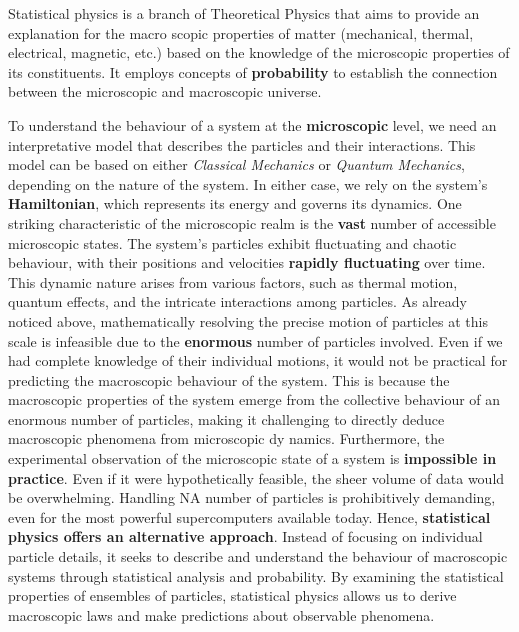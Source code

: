 \documentclass[12pt,a4paper]{report}
\newcommand{\esp}{\vspace{0.5cm}}
\begin{document}
Statistical physics is a branch of Theoretical Physics that aims to provide an explanation for the macro
scopic properties of matter (mechanical, thermal, electrical, magnetic, etc.) based on the knowledge of the microscopic properties of its constituents. It employs concepts of \textbf{probability} to establish the connection between the microscopic and macroscopic universe.

\esp

To understand the behaviour of a system at the \textbf{microscopic} level, we need an interpretative model that describes the particles and their interactions. This model can be based on either \textit{Classical Mechanics} or \textit{Quantum Mechanics}, depending on the nature of the system. In either case, we rely on the system’s \textbf{Hamiltonian}, which represents its energy and governs its dynamics. One striking characteristic of the microscopic realm is the \textbf{vast} number of accessible microscopic states. The system’s particles exhibit fluctuating and chaotic behaviour, with their positions and velocities \textbf{rapidly fluctuating} over time. This dynamic nature arises from various factors, such as thermal motion, quantum effects, and the intricate interactions among particles. As already noticed above, mathematically resolving the precise motion of particles at this scale is infeasible due to the \textbf{enormous} number of particles involved. Even if we had complete knowledge of their individual motions, it would not be practical for predicting the macroscopic behaviour of the system. This is because the macroscopic properties of the system emerge from the collective behaviour of an enormous number of particles, making it challenging to directly deduce macroscopic phenomena from microscopic dy namics. Furthermore, the experimental observation of the microscopic state of a system is \textbf{impossible in practice}. Even if it were hypothetically feasible, the sheer volume of data would be overwhelming. Handling NA number of particles is prohibitively demanding, even for the most powerful supercomputers available today. Hence, \textbf{statistical physics offers an alternative approach}. Instead of focusing on individual
particle details, it seeks to describe and understand the behaviour of macroscopic systems through statistical analysis and probability. By examining the statistical properties of ensembles of particles, statistical physics allows us to derive macroscopic laws and make predictions about observable phenomena.

\esp
\end{document}
